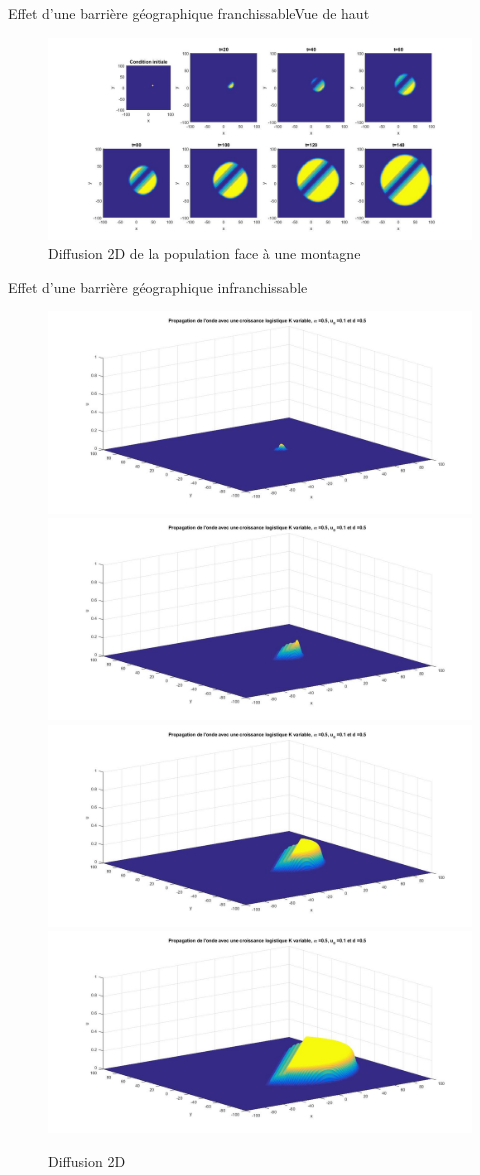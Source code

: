 \documentclass[10pt]{beamer}
\begin{document}
\begin{frame}{Effet d'une barrière géographique franchissable}{Vue de haut}
\begin{figure}[H]
	\centering
	\includegraphics[width=0.9\linewidth]{SimulationKPP/Enviro/montagneVueHaut}
	\caption{Diffusion 2D de la population face à une montagne}
\end{figure}
\end{frame}

\begin{frame}{Effet d'une barrière géographique infranchissable}{}
\begin{figure}[H]
	\centering
	\includegraphics[width=0.5\linewidth]{SimulationKPP/Enviro/poleNord1}\hfill
	\includegraphics[width=0.5\linewidth]{SimulationKPP/Enviro/poleNord3}\hfill
	\includegraphics[width=0.5\linewidth]{SimulationKPP/Enviro/poleNord5}\hfill
	\includegraphics[width=0.5\linewidth]{SimulationKPP/Enviro/poleNord8}
	\caption{Diffusion 2D}
\end{figure}
\end{frame}
\end{document}

